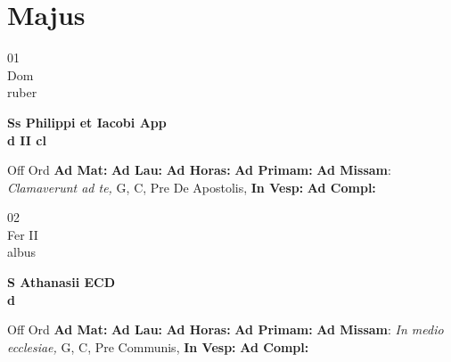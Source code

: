 \documentclass[10pt, openany]{book}
\begin{document}
    \chapter{Majus}
                    
    \begin{center}
        \begin{minipage}{3.5in}
            \vspace{2em}
            \begin{minipage}{0.5in}
                {\Huge 01} \\
                {\normalsize Dom} \\
                {\normalsize ruber}
            \end{minipage}
            \begin{minipage}{3.0in}
                \textbf{ \large Ss Philippi et Iacobi App \\
                \textnormal{\normalsize d II cl}} \\ 
            \end{minipage}
            \begin{justify}Off Ord
                \textbf{Ad Mat: }
                \textbf{Ad Lau: }
                \textbf{Ad Horas: }
                \textbf{Ad Primam: }\textbf{Ad Missam}: \textit{Clamaverunt ad te,} G, C, Pre De Apostolis,  
                \textbf{In Vesp: }
                \textbf{Ad Compl: }
            \end{justify}
        \end{minipage}
    \end{center}

    \begin{center}
        \begin{minipage}{3.5in}
            \vspace{2em}
            \begin{minipage}{0.5in}
                {\Huge 02} \\
                {\normalsize Fer II} \\
                {\normalsize albus}
            \end{minipage}
            \begin{minipage}{3.0in}
                \textbf{ \large S Athanasii ECD \\
                \textnormal{\normalsize d}} \\ 
            \end{minipage}
            \begin{justify}Off Ord
                \textbf{Ad Mat: }
                \textbf{Ad Lau: }
                \textbf{Ad Horas: }
                \textbf{Ad Primam: }\textbf{Ad Missam}: \textit{In medio ecclesiae,} G, C, Pre Communis,  
                \textbf{In Vesp: }
                \textbf{Ad Compl: }
            \end{justify}
        \end{minipage}
    \end{center}
\end{document}
